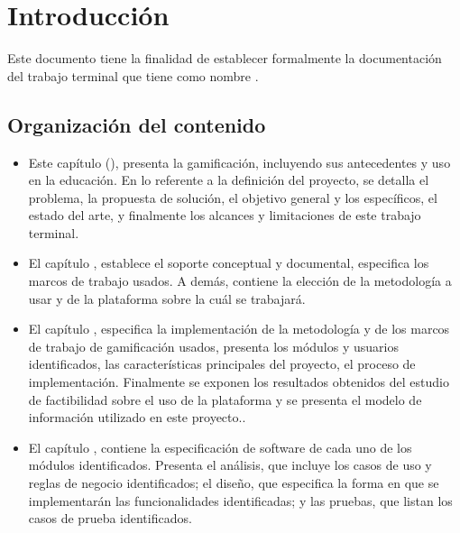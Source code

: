 \chapter{Introducción}
\label{ch:introduccion}

 Este documento tiene la finalidad de establecer formalmente la documentación del
 trabajo terminal {\numeroTT} que tiene como nombre {\bf\tituloTT}.

\section{Organización del contenido}

    \begin{itemize}
        \item Este capítulo (), presenta la
        gamificación, incluyendo sus antecedentes y uso en la educación. En lo 
        referente a la definición del proyecto, se detalla el problema, la propuesta 
        de solución, el objetivo general y los específicos, el estado del arte, y 
        finalmente los alcances y limitaciones de este trabajo terminal.

        \item El capítulo , establece el soporte conceptual
        y documental, especifica los marcos de trabajo usados. A demás, contiene la 
        elección de la metodología a usar y de la plataforma sobre la cuál se 
        trabajará.

        \item El capítulo , especifica la implementación de la 
        metodología y de los marcos de trabajo de gamificación usados, presenta los 
        módulos y usuarios identificados, las características principales del 
        proyecto, el proceso de implementación. Finalmente se exponen los resultados 
        obtenidos del estudio de factibilidad sobre el uso de la plataforma y se 
        presenta el modelo de información utilizado en este proyecto..

        \item El capítulo , contiene la especificación de 
        software de cada uno de los módulos identificados. Presenta el análisis, 
        que incluye los casos de uso y reglas de negocio identificados; el diseño, 
        que especifica la forma en que se implementarán las funcionalidades
        identificadas; y las pruebas, que listan los casos de prueba identificados.

    \end{itemize}


